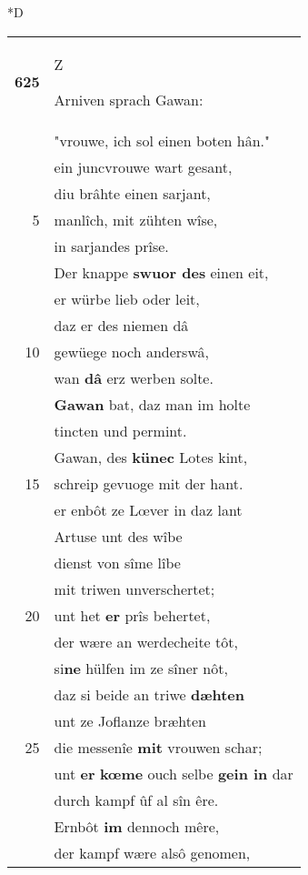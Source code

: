 \documentclass[8pt,a4paper,notitlepage]{article}
\begin{document}
\begin{table}[ht]
\begin{minipage}[t]{0.5\linewidth}
\small
\begin{center}*D
\end{center}
\begin{tabular}{rl}
\textbf{625} & \begin{large}Z\end{large}Arniven sprach Gawan:\\ 
 & "vrouwe, ich sol einen boten hân."\\ 
 & ein juncvrouwe wart gesant,\\ 
 & diu brâhte einen sarjant,\\ 
5 & manlîch, mit zühten wîse,\\ 
 & in sarjandes prîse.\\ 
 & Der knappe \textbf{swuor des} einen eit,\\ 
 & er würbe lieb oder leit,\\ 
 & daz er des niemen dâ\\ 
10 & gewüege noch anderswâ,\\ 
 & wan \textbf{dâ} erz werben solte.\\ 
 & \textbf{Gawan} bat, daz man im holte\\ 
 & tincten und permint.\\ 
 & Gawan, des \textbf{künec} Lotes kint,\\ 
15 & schreip gevuoge mit der hant.\\ 
 & er enbôt ze Lœver in daz lant\\ 
 & Artuse unt des wîbe\\ 
 & dienst von sîme lîbe\\ 
 & mit triwen unverschertet;\\ 
20 & unt het \textbf{er} prîs behertet,\\ 
 & der wære an werdecheite tôt,\\ 
 & si\textbf{ne} hülfen im ze sîner nôt,\\ 
 & daz si beide an triwe \textbf{dæhten}\\ 
 & unt ze Joflanze bræhten\\ 
25 & die messenîe \textbf{mit} vrouwen schar;\\ 
 & unt \textbf{er} \textbf{kœme} ouch selbe \textbf{gein in} dar\\ 
 & durch kampf ûf al sîn êre.\\ 
 & Ernbôt \textbf{im} dennoch mêre,\\ 
 & der kampf wære alsô genomen,\\ 

\end{tabular}
\end{minipage}
\end{table}
\end{document}
